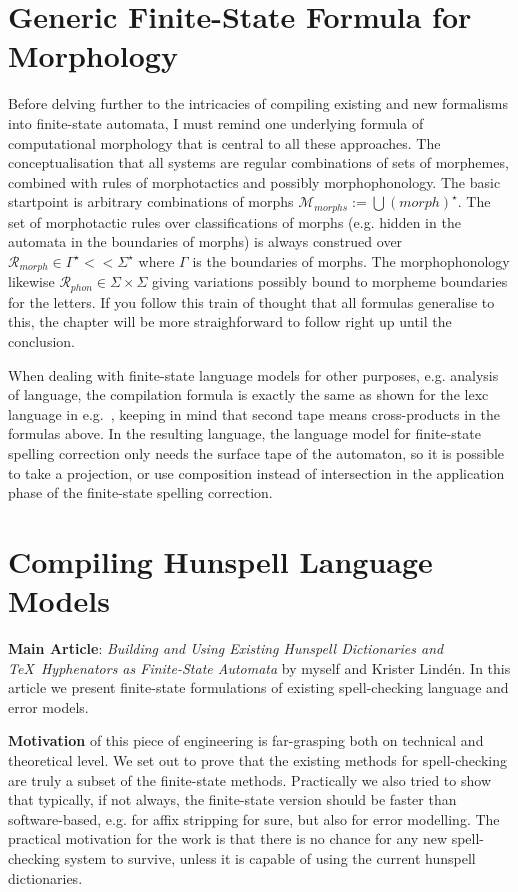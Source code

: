 \documentclass[officiallayout]{unihelcompling}
\begin{document}
\section{Generic Finite-State Formula for Morphology}
\label{sec:generic}

Before delving further to the intricacies of compiling existing and new
formalisms into finite-state automata, I must remind one underlying formula
of computational morphology that is central to all these approaches. The
conceptualisation that all systems are regular combinations of sets of
morphemes, combined with rules of morphotactics and possibly morphophonology.
The basic startpoint is arbitrary combinations of morphs $\mathcal{M}_{morphs}
:= \bigcup ({morph})^\star$. The set of morphotactic rules over classifications
of morphs (e.g. hidden in the automata in the boundaries of morphs) is always
construed over $\mathcal{R}_{morph} \in \Gamma^\star << \Sigma^\star$ where
$\Gamma$ is the boundaries of morphs. The morphophonology likewise 
$\mathcal{R}_{phon} \in \Sigma \times \Sigma$ giving variations possibly bound
to morpheme boundaries for the letters. If you follow this train of thought
that all formulas generalise to this, the chapter will be more straighforward
to follow right up until the conclusion.

When dealing with finite-state language models for other purposes, e.g.
analysis of language, the compilation formula is exactly the same as shown for
the lexc language in e.g.~\citep{linden2009hfst}, keeping in mind that second
tape means cross-products in the formulas above. In the resulting language, the
language model for finite-state spelling correction only needs the surface tape
of the automaton, so it is possible to take a projection, or use composition
instead of intersection in the application phase of the finite-state
spelling correction.

\section{Compiling Hunspell Language Models}
\label{sec:hunspell}

\textbf{Main Article}: \emph{Building and Using Existing Hunspell Dictionaries
and \TeX\ Hyphenators as Finite-State Automata} by myself and Krister Lindén.
In this article we present finite-state formulations of existing spell-checking
language and error models.

\textbf{Motivation} of this piece of engineering is far-grasping both on 
technical and theoretical level. We set out to prove that the existing
methods for spell-checking are truly a subset of the finite-state methods.
Practically we also tried to show that typically, if not always, the 
finite-state version should be faster than software-based, e.g. for affix
stripping for sure, but also for error modelling. The practical motivation
for the work is that there is no chance for any new spell-checking system to
survive, unless it is capable of using the current hunspell dictionaries.
\end{document}
